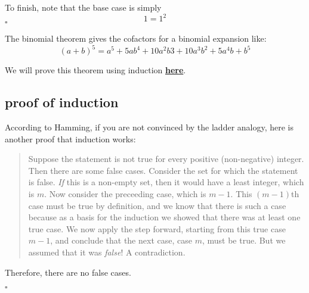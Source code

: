 \documentclass[11pt, oneside]{article}
\begin{document}
To finish, note that the base case is simply
\[ 1 = 1^2 \]
$\square$

The binomial theorem gives the cofactors for a binomial expansion like:
\[ (a + b)^5 = a^5 + 5ab^4 + 10a^2b3 + 10a^3b^2 + 5a^4b + b^5 \]

We will prove this theorem using induction \hyperref[sec:binomial]{\textbf{here}}.

\subsection*{proof of induction}

According to Hamming, if you are not convinced by the ladder analogy, here is another proof that induction works:

\begin{quote}Suppose the statement is not true for every positive (non-negative) integer.  Then there are some false cases.  Consider the set for which the statement is false.  \emph{If} this is a non-empty set, then it would have a least integer, which is $m$.  Now consider the preceeding case, which is $m - 1$.  This $(m-1)$th case must be true by definition, and we know that there is such a case because as a basis for the induction we showed that there was at least one true case.  We now apply the step forward, starting from this true case $m-1$, and conclude that the next case, case $m$, must be true.  But we assumed that it was \emph{false}!  A contradiction. \end{quote}

Therefore, there are no false cases.

$\square$
\end{document}
